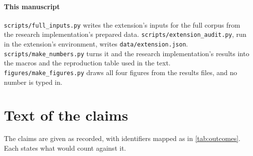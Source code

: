 \paragraph{This manuscript}
\texttt{scripts/full\_inputs.py} writes the extension's inputs for the full corpus from the research implementation's prepared data.
\texttt{scripts/extension\_audit.py}, run in the extension's environment, writes \texttt{data/extension.json}.
\texttt{scripts/make\_numbers.py} turns it and the research implementation's results into the macros and the reproduction table used in the text.
\texttt{figures/make\_figures.py} draws all four figures from the results files, and no number is typed in.

\section{Text of the claims}
\label{app:claims}

The claims are given as recorded, with identifiers mapped as in \cref{tab:outcomes}.
Each states what would count against it.

